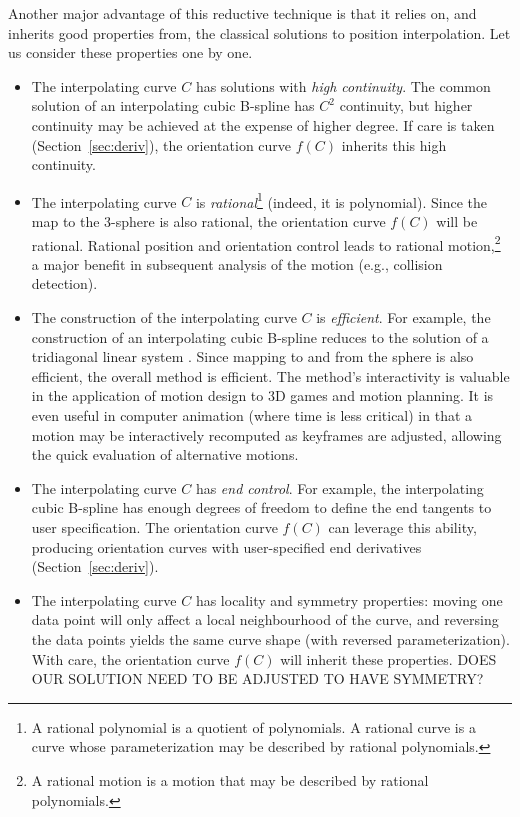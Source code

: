 \documentclass[12pt]{article}
\begin{document}
Another major advantage of this reductive technique is that it relies
on, and inherits good properties from, the classical solutions to 
position interpolation.
Let us consider these properties one by one.
\begin{itemize}
\item
The interpolating curve $C$ has solutions with {\em high continuity}.
The common solution of an interpolating cubic B-spline \cite{farin02} 
has $C^2$ continuity,
but higher continuity may be achieved at the expense of higher degree.
If care is taken (Section~\ref{sec:deriv}), the orientation curve $f(C)$ inherits
this high continuity.
\item
The interpolating curve $C$ is {\em rational}\footnote{A rational polynomial 
  is a quotient of polynomials.
  A rational curve is a curve whose parameterization may be described by 
  rational polynomials.}
(indeed, it is polynomial).
Since the map to the 3-sphere is also rational,
the orientation curve $f(C)$ will be rational.
Rational position and orientation control leads to rational motion,\footnote{A rational 
  motion is a motion that may be described by rational polynomials.}
a major benefit in subsequent analysis of the motion (e.g., collision detection).
\item 
The construction of the interpolating curve $C$ is {\em efficient}.
For example, the construction of an interpolating cubic B-spline reduces
to the solution of a tridiagonal linear system \cite{farin02}.
Since mapping to and from the sphere is also efficient, 
the overall method is efficient.
The method's interactivity is valuable in the application of motion design
to 3D games and motion planning.
It is even useful in computer animation (where time is less critical) in that 
a motion may be interactively recomputed as keyframes are adjusted,
allowing the quick evaluation of alternative motions.
\item The interpolating curve $C$ has {\em end control}.
For example, the interpolating cubic B-spline has enough degrees of freedom
to define the end tangents to user specification.
The orientation curve $f(C)$ can leverage this ability, producing orientation curves
with user-specified end derivatives (Section~\ref{sec:deriv}).
\item The interpolating curve $C$ has locality and symmetry properties:
moving one data point will only affect a local neighbourhood of the curve,
and reversing the data points yields the same curve shape 
(with reversed parameterization).
With care, the orientation curve $f(C)$ will inherit these properties.
DOES OUR SOLUTION NEED TO BE ADJUSTED TO HAVE SYMMETRY?
\end{itemize}
\end{document}
